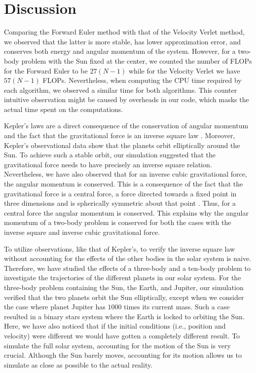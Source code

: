 \documentclass[a4paper]{article}
\begin{document}
\section{Discussion}
Comparing the Forward Euler method with that of the Velocity Verlet method, we observed that the latter is more stable, has lower approximation error, and conserves both energy and angular momentum of the system. However, for a two-body problem with the Sun fixed at the center, we counted the number of FLOPs for the Forward Euler to be $27(N-1)$ while for the Velocity Verlet we have $57(N-1)$ FLOPs. Nevertheless, when computing the CPU time required by each algorithm, we observed a similar time for both algorithms. This counter intuitive observation might be caused by overheads in our code, which masks the actual time spent on the computations.

Kepler's laws are a direct consequence of the conservation of angular momentum and the fact that the gravitational force is an inverse square law \cite{giordano}. Moreover, Kepler's observational data show that the planets orbit elliptically around the Sun. To achieve such a stable orbit, our simulation suggested that the gravitational force needs to have precisely an inverse square relation. Nevertheless, we have also observed that for an inverse cubic gravitational force, the angular momentum is conserved. This is a consequence of the fact that the gravitational force is a central force, a force directed towards a fixed point in three dimensions and is spherically symmetric about that point \cite{goldstein}. Thus, for a central force the angular momentum is conserved. This explains why the angular momentum of a two-body problem is conserved for both the cases with the inverse square and inverse cubic gravitational force. 

To utilize observations, like that of Kepler's, to verify the inverse square law without accounting for the effects of the other bodies in the solar system is naive. Therefore, we have studied the effects of a three-body and a ten-body problem to investigate the trajectories of the different planets in our solar system. For the three-body problem containing the Sun, the Earth, and Jupiter, our simulation verified that the two planets orbit the Sun elliptically, except when we consider the case where planet Jupiter has $1000$ times its current mass. Such a case resulted in a binary stars system where the Earth is locked to orbiting the Sun. Here, we have also noticed that if the initial conditions (i.e., position and velocity) were different we would have gotten a completely different result. To simulate the full solar system, accounting for the motion of the Sun is very crucial. Although the Sun barely moves, accounting for its motion allows us to simulate as close as possible to the actual reality.
\end{document}
